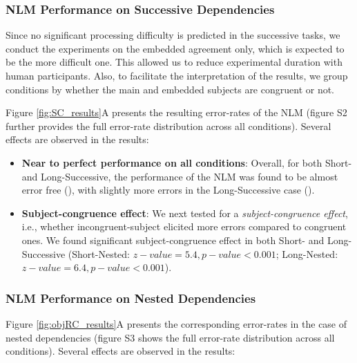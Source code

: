 \subsubsection{NLM Performance on Successive Dependencies}
Since no significant processing difficulty is predicted in the successive tasks, we conduct the experiments on the embedded agreement only, which is expected to be the more difficult one. This allowed us to reduce experimental duration with human participants. Also, to facilitate the interpretation of the results, we group conditions by whether the main and embedded subjects are congruent or not.

Figure \ref{fig:SC_results}A presents the resulting error-rates of the NLM (figure S2 further provides the full error-rate distribution across all conditions). Several effects are observed in the results: 

\begin{itemize}
    \item \textbf{Near to perfect performance on all conditions}: Overall, for both Short- and Long-Successive, the performance of the NLM was found to be almost error free (), with slightly more errors in the Long-Successive case (). 
    \item \textbf{Subject-congruence effect}: We next tested for a \textit{subject-congruence effect}, i.e., whether incongruent-subject elicited more errors compared to congruent ones. We found significant subject-congruence effect in both Short- and Long-Successive (Short-Nested: $z-value=5.4, p-value<0.001$; Long-Nested: $z-value=6.4, p-value<0.001$).
\end{itemize}
 
\subsubsection{NLM Performance on Nested Dependencies}
Figure \ref{fig:objRC_results}A presents the corresponding error-rates in the case of nested dependencies (figure S3 shows the full error-rate distribution across all conditions). Several effects are observed in the results:

